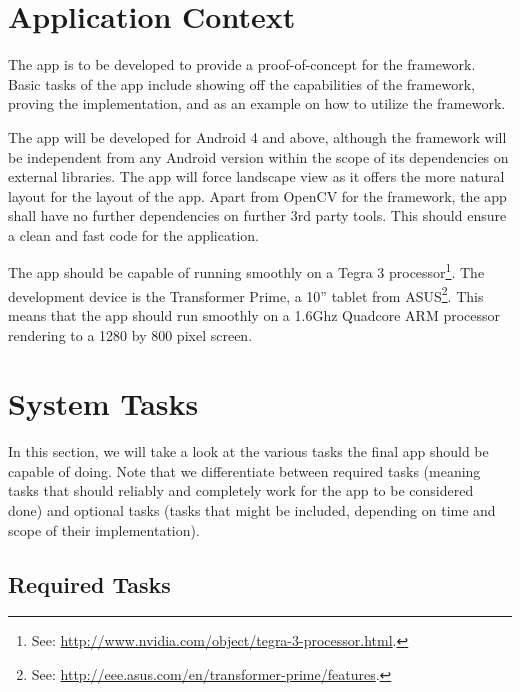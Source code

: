 \section{Application Context}

The app is to be developed to provide a proof-of-concept for the framework.
Basic tasks of the app include showing off the capabilities of the framework, proving the implementation, and as an example on how to utilize the framework.

The app will be developed for Android 4 and above, although the framework will be independent from any Android version within the scope of its dependencies on external libraries.
The app will force landscape view as it offers the more natural layout for the layout of the app.
Apart from OpenCV for the framework, the app shall have no further dependencies on further 3rd party tools.
This should ensure a clean and fast code for the application.

The app should be capable of running smoothly on a Tegra 3 processor\footnote{See: \url{http://www.nvidia.com/object/tegra-3-processor.html}.}.
The development device is the Transformer Prime, a 10'' tablet from ASUS\footnote{See: \url{http://eee.asus.com/en/transformer-prime/features}.}.
This means that the app should run smoothly on a 1.6Ghz Quadcore ARM processor rendering to a 1280 by 800 pixel screen.

\section{System Tasks}

In this section, we will take a look at the various tasks the final app should be capable of doing.
Note that we differentiate between required tasks (meaning tasks that should reliably and completely work for the app to be considered done) and optional tasks (tasks that might be included, depending on time and scope of their implementation).

\subsection{Required Tasks}

